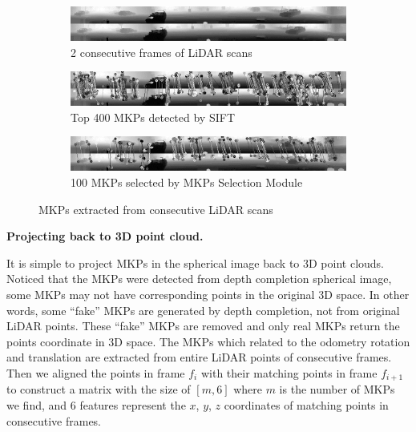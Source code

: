 \documentclass[sigconf]{acmart}
\newcommand{\bfsection}[1]{\vspace*{0.1cm}\noindent\textbf{#1.}}
\begin{document}
\begin{figure}[h]
     \centering
     \begin{subfigure}[b]{0.9\textwidth}
         \centering
         \includegraphics[width=\textwidth]{Figures/MKP a.png}
         \caption{2 consecutive frames of LiDAR scans}
     \end{subfigure}

     \begin{subfigure}[b]{0.9\textwidth}
         \centering
         \includegraphics[width=\textwidth]{Figures/MKP b.png}
         \caption{Top 400 MKPs detected by SIFT}
     \end{subfigure}
     
     \begin{subfigure}[b]{0.9\textwidth}
         \centering
         \includegraphics[width=\textwidth]{Figures/MKP c.png}
         \caption{100 MKPs selected by MKPs Selection Module}
     \end{subfigure}
     \vspace{-0.3cm}
        \caption{MKPs extracted from consecutive LiDAR scans}
        \label{fig:MKPs}
\end{figure}


\bfsection{Projecting back to 3D point cloud}

It is simple to project MKPs in the spherical image back to 3D point clouds. Noticed that the MKPs were detected from depth completion spherical image, some MKPs may not have corresponding points in the original 3D space. In other words, some “fake” MKPs are generated by depth completion, not from original LiDAR points. These “fake” MKPs are removed and only real MKPs return the points coordinate in 3D space. The MKPs which related to the odometry rotation and translation are extracted from entire LiDAR points of consecutive frames. Then we aligned the points in frame $f_i$ with their matching points in frame $f_{i+1}$ to construct a matrix with the size of $[m , 6]$ where $m$ is the number of MKPs we find, and 6 features represent the $x$, $y$, $z$ coordinates of matching points in consecutive frames. 
\end{document}
